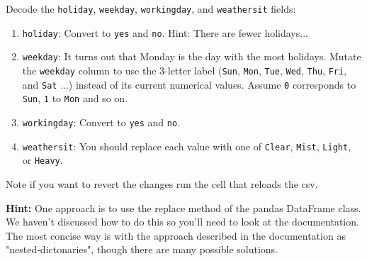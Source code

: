 \documentclass[11pt]{article}
\providecommand{\tightlist}{%
      \setlength{\itemsep}{0pt}\setlength{\parskip}{0pt}}
\begin{document}
Decode the \texttt{holiday}, \texttt{weekday}, \texttt{workingday}, and
\texttt{weathersit} fields:

\begin{enumerate}
\def\labelenumi{\arabic{enumi}.}
\tightlist
\item
  \texttt{holiday}: Convert to \texttt{yes} and \texttt{no}. Hint: There
  are fewer holidays...
\item
  \texttt{weekday}: It turns out that Monday is the day with the most
  holidays. Mutate the
  \texttt{\textquotesingle{}weekday\textquotesingle{}} column to use the
  3-letter label (\texttt{\textquotesingle{}Sun\textquotesingle{}},
  \texttt{\textquotesingle{}Mon\textquotesingle{}},
  \texttt{\textquotesingle{}Tue\textquotesingle{}},
  \texttt{\textquotesingle{}Wed\textquotesingle{}},
  \texttt{\textquotesingle{}Thu\textquotesingle{}},
  \texttt{\textquotesingle{}Fri\textquotesingle{}}, and
  \texttt{\textquotesingle{}Sat\textquotesingle{}} ...) instead of its
  current numerical values. Assume \texttt{0} corresponds to
  \texttt{Sun}, \texttt{1} to \texttt{Mon} and so on.
\item
  \texttt{workingday}: Convert to \texttt{yes} and \texttt{no}.
\item
  \texttt{weathersit}: You should replace each value with one of
  \texttt{Clear}, \texttt{Mist}, \texttt{Light}, or \texttt{Heavy}.
\end{enumerate}

Note if you want to revert the changes run the cell that reloads the
csv.

\textbf{Hint:} One approach is to use the replace method of the pandas
DataFrame class. We haven't discussed how to do this so you'll need to
look at the documentation. The most concise way is with the approach
described in the documentation as "nested-dictonaries", though there are
many possible solutions.
\end{document}
